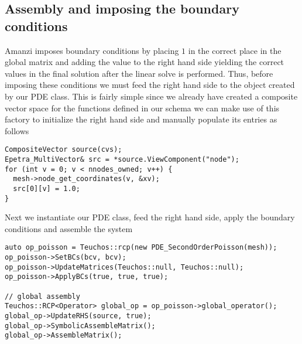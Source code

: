 \subsection{Assembly and imposing the boundary conditions}\label{Sec:AssemblyAndBoundaryCond}
%
Amanzi imposes boundary conditions by placing $1$ in the correct place in the global matrix and adding the value to the right hand side yielding the correct values in the final solution after the linear solve is performed. Thus, before imposing these conditions we must feed the right hand side to the object created by our PDE class. This is fairly simple since we already have created a composite vector space for the functions defined in our schema we can make use of this factory to initialize the right hand side and manually populate its entries as follows
%
\begin{lstlisting}
CompositeVector source(cvs);
Epetra_MultiVector& src = *source.ViewComponent("node");
for (int v = 0; v < nnodes_owned; v++) {
  mesh->node_get_coordinates(v, &xv);
  src[0][v] = 1.0;
}
\end{lstlisting}
%
Next we instantiate our PDE class, feed the right hand side, apply the boundary conditions and assemble the system
%
\begin{lstlisting}
auto op_poisson = Teuchos::rcp(new PDE_SecondOrderPoisson(mesh));
op_poisson->SetBCs(bcv, bcv);
op_poisson->UpdateMatrices(Teuchos::null, Teuchos::null);
op_poisson->ApplyBCs(true, true, true);

// global assembly
Teuchos::RCP<Operator> global_op = op_poisson->global_operator();
global_op->UpdateRHS(source, true);
global_op->SymbolicAssembleMatrix();
global_op->AssembleMatrix();
\end{lstlisting}
%
